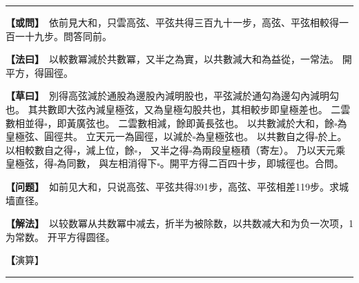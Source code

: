 \documentclass[11pt,a4paper]{article}
\let\origsquare\square
\renewcommand{\square}{\ensuremath{\origsquare}}%
\newcommand{\longline}{\noindent\rule{\textwidth}{0.4pt}}
\newcommand{\clOWEN}[1]{%
  \par\vspace{0.3em}%
  \noindent\textcolor{problemcolor}{\textbf{【或問】}}\,{\tradfont #1}\par\nopagebreak%
}
\newcommand{\mdOWEN}[1]{%
  \par\vspace{0.3em}%
  \noindent\textcolor{problemcolor}{\textbf{【问题】}}\,{\modfont #1}\par\nopagebreak%
}
\newcommand{\clFAYUE}[1]{%
  \par\noindent\textcolor{methodcolor}{\textbf{【法曰】}}\,{\tradfont #1}\par\nopagebreak%
}
\newcommand{\mdFAYUE}[1]{%
  \par\noindent\textcolor{methodcolor}{\textbf{【解法】}}\,{\modfont #1}\par\nopagebreak%
}
\newcommand{\clTSAOYUE}[1]{%
  \par\noindent\textcolor{workcolor}{\textbf{【草曰】}}\,{\tradfont #1}\par%
}
\newcommand{\mdTSAOYUE}[1]{%
  \par\noindent\textcolor{workcolor}{\textbf【演算】}}\,{\modfont #1}\par%
\begin{document}
\vspace{0.3cm}
\begin{center}\longline\end{center}

\begin{paracol}{2}

\begin{leftcolumn}
\clOWEN{%
依前見大和，只雲高弦、平弦共得三百九十一步，高弦、平弦相較得一百一十九步。問答同前。}

\clFAYUE{%
以較數冪減於共數冪，又半之為實，以共數減大和為益從，一常法。
開平方，得圓徑。}

\clTSAOYUE{%
別得高弦減於通股為邊股內減明股也，平弦減於通勾為邊勾內減明勾也。
其共數即大弦內減皇極弦，又為皇極勾股共也，其相較步即皇極差也。
二雲數相並得$\square$，即黃廣弦也。
二雲數相減，餘即黃長弦也。
以共數減於大和，餘$\square$為皇極弦、圓徑共。
立天元一為圓徑，以減於$\square$為皇極弦也。
以共數自之得$\square$於上。
以相較數自之得$\square$，減上位，餘$\square$，
又半之得$\square$為兩段皇極積（寄左）。
乃以天元乘皇極弦，得$\square$為同數，
與左相消得下$\square$。開平方得二百四十步，即城徑也。合問。}
\end{leftcolumn}

\switchcolumn

\begin{rightcolumn}
\mdOWEN{%
如前见大和，只说高弦、平弦共得391步，高弦、平弦相差119步。求城墙直径。}

\mdFAYUE{%
以较数冪从共数冪中减去，折半为被除数，以共数减大和为负一次项，1为常数。
开平方得圆径。}

\mdTSAOYUE{%
辨识得：高弦减于通股为边股内减明股，平弦减于通勾为边勾内减明勾。
共数即大弦内减皇极弦，又为皇极勾股之和，相差步即皇极差。
两已知数相并得$\square$即黄广弦。
两已知数相减余即黄长弦。
以共数减于大和余$\square$为皇极弦、圆径之和。
设天元一为圆径，从$\square$中减去为皇极弦。
以共数自乘得$\square$于上位。
以相较数自乘得$\square$，减上位余$\square$，
折半得$\square$为两段皇极积（寄左）。
以天元乘皇极弦得$\square$为同数，
与左式相消得下式$\square$。开平方得240步即城径。符合所问。}
\end{rightcolumn}

\end{paracol}

\vspace{0.3cm}
\begin{center}\longline\end{center}
\end{document}
